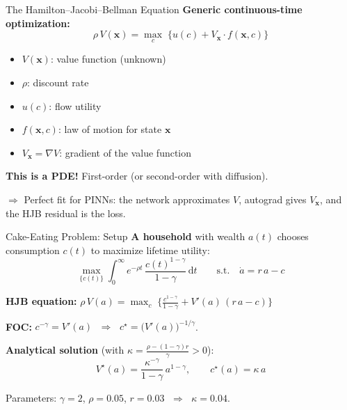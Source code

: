 \documentclass[aspectratio=169,11pt]{beamer}
\newcommand{\emphc}[1]{\textcolor{harvardcrimson}{#1}}
\newcommand{\x}{\bm{x}}
\begin{document}
\begin{frame}{The Hamilton--Jacobi--Bellman Equation}
\textbf{Generic continuous-time optimization:}
\[
\rho\, V(\x) = \max_{c}\;\bigl\{u(c) + V_{\x}\cdot f(\x, c)\bigr\}
\]

\vspace{0.3em}
\begin{itemize}
    \item $V(\x)$: \emphc{value function} (unknown)
    \item $\rho$: discount rate
    \item $u(c)$: flow utility
    \item $f(\x,c)$: law of motion for state $\x$
    \item $V_{\x} = \nabla V$: gradient of the value function
\end{itemize}

\vspace{0.4em}
\textbf{This is a PDE!} First-order (or second-order with diffusion).

\vspace{0.3em}
$\Rightarrow$ \emphc{Perfect fit for PINNs:} the network approximates $V$, autograd gives $V_{\x}$, and the HJB residual is the loss.
\end{frame}

\begin{frame}{Cake-Eating Problem: Setup}
\textbf{A household} with wealth $a(t)$ chooses consumption $c(t)$ to maximize lifetime utility:
\[
\max_{\{c(t)\}} \int_0^\infty e^{-\rho t}\,\frac{c(t)^{1-\gamma}}{1-\gamma}\,\mathrm{d}t
\qquad\text{s.t.}\quad \dot{a} = r\,a - c
\]

\textbf{HJB equation:}\quad
$\rho\,V(a) = \max_c\;\bigl\{\frac{c^{1-\gamma}}{1-\gamma} + V'(a)\,(r\,a - c)\bigr\}$

\vspace{0.2em}
\textbf{FOC:} $c^{-\gamma} = V'(a)$ $\;\Rightarrow\;$ $c^\star = \bigl(V'(a)\bigr)^{-1/\gamma}$.

\vspace{0.2em}
\textbf{Analytical solution} (with $\kappa = \frac{\rho - (1-\gamma)r}{\gamma} > 0$):
\[
V^\star(a) = \frac{\kappa^{-\gamma}}{1-\gamma}\,a^{1-\gamma}, \qquad c^\star(a) = \kappa\,a
\]

{\small Parameters: $\gamma = 2$, $\rho = 0.05$, $r = 0.03$ $\;\Rightarrow\;$ $\kappa = 0.04$.}
\end{frame}
\end{document}
